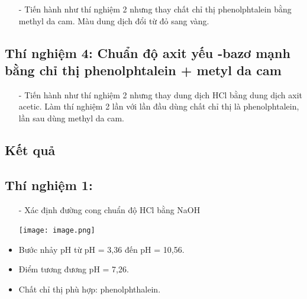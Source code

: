 \documentclass[12pt,a4paper]{report}
\begin{document}
\begin{itemize}
    \item[-] Tiến hành như thí nghiệm 2 nhưng thay chất chỉ thị phenolphtalein bằng methyl da cam. Màu dung dịch đổi từ đỏ sang vàng.
\end{itemize}

\subsection*{Thí nghiệm 4: Chuẩn độ axit yếu -bazơ mạnh bằng chỉ thị phenolphtalein + metyl da cam}

\begin{itemize}
    \item[-] Tiến hành như thí nghiệm 2 nhưng thay dung dịch HCl bằng dung dịch axit acetic. Làm thí nghiệm 2 lần với lần đầu dùng chất chỉ thị là phenolphtalein, lần sau dùng methyl da cam.
\end{itemize}
\newpage
\subsection{Kết quả}
\subsection*{Thí nghiệm 1:} 
\begin{itemize}
 \item[-] Xác định đường cong chuẩn độ HCl bằng NaOH
    \begin{center}
         \texttt{[image: image.png]}
    \end{center}
\item Bước nhảy pH từ pH = 3,36 đến pH = 10,56.
\item Điểm tương đương pH = 7,26.
\item Chất chỉ thị phù hợp: phenolphthalein.
\end{itemize}
\end{document}
